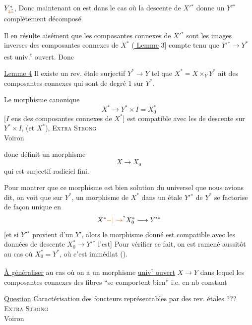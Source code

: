 $Y^{*}_{\deleted{\unsure{1}}}$, Donc maintenant on est dans le cas où la descente de $X'{}^{*}$ donne un $Y'{}^{*}$ complètement décomposé.

Il en résulte aisément que les composantes connexes de $X'{}^{*}$ sont les images inverses des composantes connexes de $X^{*}$ (\uline{ Lemme} 3] compte tenu que  $Y'{}^{*}\to Y^{*}$ est univ.\textsuperscript{t} ouvert. Donc

\uline{Lemme 4} Il existe un rev. étale surjectif $Y^{*}\longrightarrow Y$ tel que $X^{*}=X\times_Y Y^{*}$ ait des composantes connexes qui sont de degré $1$ sur $Y^{*}$.

Le morphisme canonique
\[
X^{*}\longrightarrow Y^{*}\times I=X^{*}_0
\]
[$I$ ens des composantes connexes de $X^{*}$] est compatible   avec les  de descente sur $Y^{*}\times I$, (et $X^{*}$), \unsure{\textbackslash}
\textsc{Extra Strong}\\
 Voiron

donc définit un morphisme 
\[
X\longrightarrow X_0
\]
qui est surjectif radiciel fini.

Pour montrer que ce morphisme est bien solution du  universel que nous avions dit, on voit que sur $Y^{*}$, un morphisme de $X^{*}$ dans un  étale $Y'{}^{*}$ de $Y^{*}$ se factorise de façon unique en
\[
X^{*}\unsure{-|\to} X_0^{*}\longrightarrow Y'{}^{*}
\]
[et si $Y'{}^{*}$ provient d'un $Y'$, alors le morphisme donné est compatible avec les données de descente  $X^{*}_0\to Y'{}^{*}$ l'est] Pour vérifier ce fait, on est ramené aussitôt au cas où $X^{*}_0=Y^{*}$, où c'est immédiat \unsure{---} ().

\uline{À } \uline{généraliser} au cas où on a un morphisme  \uline{univ\textsuperscript{t} ouvert} $X\to Y$ dans lequel les composantes connexes  des fibres ``se comportent bien'' i.e. en nb  constant 

\uline{Question} Caractérisation des foncteurs représentables par des rev. étales ???
\textsc{Extra Strong}\\
 Voiron

